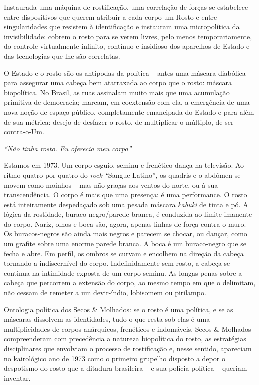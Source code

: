 Instaurada uma máquina de rostificação, uma correlação de forças se
estabelece entre dispositivos que querem atribuir a cada corpo um Rosto
e entre singularidades que resistem à identificação e instauram uma
micropolítica da invisibilidade: cobrem o rosto para se verem livres,
pelo menos temporariamente, do controle virtualmente infinito, contínuo
e insidioso dos aparelhos de Estado e das tecnologias que lhe são
correlatas.

O Estado e o rosto são os antípodas da política -- antes uma máscara
diabólica para assegurar uma cabeça bem atarraxada ao corpo que o rosto:
máscara biopolítica. No Brasil, as ruas assinalam muito mais que uma
acumulação primitiva de democracia; marcam, em coextensão com ela, a
emergência de uma nova noção de espaço público, completamente emancipada
do Estado e para além de sua métrica: desejo de desfazer o rosto, de
multiplicar o múltiplo, de ser contra-o-Um.

\emph{``Não tinha rosto. Eu oferecia meu corpo''}

Estamos em 1973. Um corpo esguio, seminu e frenético dança na televisão.
Ao ritmo quatro por quatro do \emph{rock ``}Sangue Latino'', os quadris
e o abdômen se movem como moinhos -- mas não graças aos ventos do norte,
ou à sua transcendência. O corpo é mais que uma presença: é uma
performance. O rosto está inteiramente despedaçado sob uma pesada
máscara \emph{kabuki} de tinta e pó. A lógica da rostidade,
buraco-negro/parede-branca, é conduzida ao limite imanente do corpo.
Nariz, olhos e boca são, agora, apenas linhas de força contra o muro. Os
buracos-negros são ainda mais negros e parecem se chocar, ou dançar,
como um grafite sobre uma enorme parede branca. A boca é um buraco-negro
que se fecha e abre. Em perfil, os ombros se curvam e encolhem na
direção da cabeça tornando-a indiscernível do corpo. Indefinidamente sem
rosto, a cabeça se continua na intimidade exposta de um corpo seminu. As
longas penas sobre a cabeça que percorrem a extensão do corpo, ao mesmo
tempo em que o delimitam, não cessam de remeter a um devir-índio,
lobisomem ou pirilampo.

Ontologia política dos Secos \& Molhados: se o rosto é uma política, e
se as máscaras dissolvem as identidades, tudo o que resta sob elas é uma
multiplicidades de corpos anárquicos, frenéticos e indomáveis. Secos \&
Molhados compreenderam com precedência a natureza biopolítica do rosto,
as estratégias disciplinares que envolviam o processo de rostificação e,
nesse sentido, apareciam no kairológico ano de 1973 como o primeiro
grupelho disposto a depor o despotismo do rosto que a ditadura
brasileira -- e sua polícia política -- queriam inventar.

